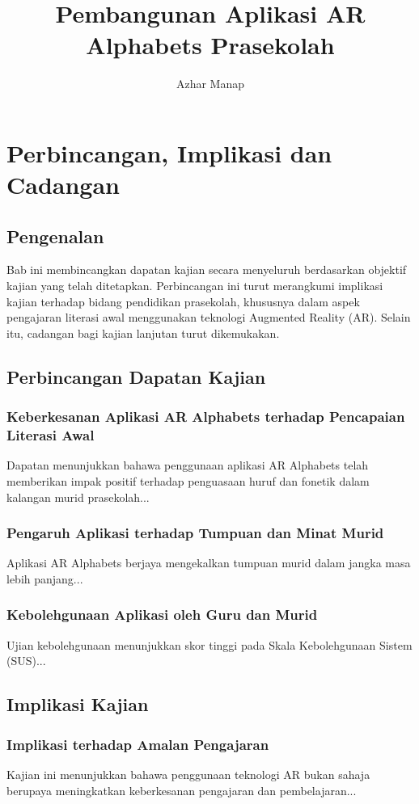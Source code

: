 \documentclass[12pt]{report}
\title{Pembangunan Aplikasi AR Alphabets Prasekolah}
\author{Azhar Manap}
\date{}
\begin{document}
\maketitle
\tableofcontents
\newpage

\chapter{Perbincangan, Implikasi dan Cadangan}

\section{Pengenalan}
Bab ini membincangkan dapatan kajian secara menyeluruh berdasarkan objektif kajian yang telah ditetapkan. Perbincangan ini turut merangkumi implikasi kajian terhadap bidang pendidikan prasekolah, khususnya dalam aspek pengajaran literasi awal menggunakan teknologi Augmented Reality (AR). Selain itu, cadangan bagi kajian lanjutan turut dikemukakan.

\section{Perbincangan Dapatan Kajian}
\subsection{Keberkesanan Aplikasi AR Alphabets terhadap Pencapaian Literasi Awal}
Dapatan menunjukkan bahawa penggunaan aplikasi AR Alphabets telah memberikan impak positif terhadap penguasaan huruf dan fonetik dalam kalangan murid prasekolah...

\subsection{Pengaruh Aplikasi terhadap Tumpuan dan Minat Murid}
Aplikasi AR Alphabets berjaya mengekalkan tumpuan murid dalam jangka masa lebih panjang...

\subsection{Kebolehgunaan Aplikasi oleh Guru dan Murid}
Ujian kebolehgunaan menunjukkan skor tinggi pada Skala Kebolehgunaan Sistem (SUS)...

\section{Implikasi Kajian}
\subsection{Implikasi terhadap Amalan Pengajaran}
Kajian ini menunjukkan bahawa penggunaan teknologi AR bukan sahaja berupaya meningkatkan keberkesanan pengajaran dan pembelajaran...
\end{document}
